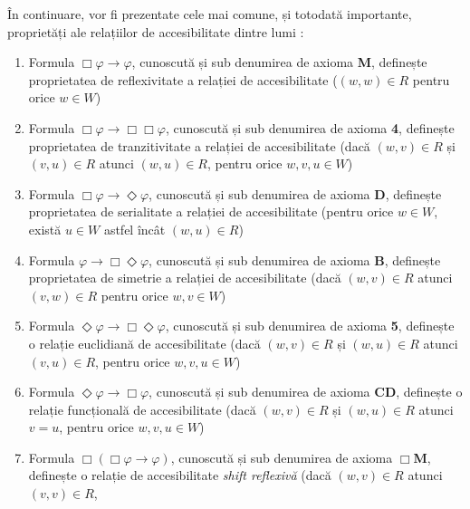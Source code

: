 \documentclass[12pt, openany]{book}
\begin{document}
            \par{}
                În continuare, vor fi prezentate cele mai comune, și totodată importante, proprietăți ale relațiilor de 
                accesibilitate dintre lumi \cite{stanford_modal_logic}:
                \begin{enumerate}
                    \item Formula $\Box \varphi \rightarrow \varphi$, cunoscută și sub denumirea de axioma \textbf{M}, definește 
                    proprietatea de reflexivitate a relației de accesibilitate ($(w,w) \in R$ pentru orice $w \in W$)
                    \item Formula $\Box \varphi \rightarrow \Box \Box \varphi$, cunoscută și sub denumirea de axioma \textbf{4},
                    definește proprietatea de tranzitivitate a relației de accesibilitate (dacă $(w,v) \in R$ și $(v,u) \in R$ 
                    atunci $(w,u) \in R$, pentru orice $w,v,u \in W$)
                    \item Formula $\Box \varphi \rightarrow \Diamond \varphi$, cunoscută și sub denumirea de axioma \textbf{D},
                    definește proprietatea de serialitate a relației de accesibilitate (pentru orice $w \in W$, există $u \in W$
                    astfel încât $(w,u) \in R$)
                    \item Formula $\varphi \rightarrow \Box \Diamond \varphi$, cunoscută și sub denumirea de axioma \textbf{B},
                    definește proprietatea de simetrie a relației de accesibilitate (dacă $(w,v) \in R$ atunci $(v,w) \in R$
                    pentru orice $w,v \in W$)
                    \item Formula $\Diamond \varphi \rightarrow \Box \Diamond \varphi$, cunoscută și sub denumirea de axioma
                    \textbf{5}, definește o relație euclidiană de accesibilitate (dacă $(w,v) \in R$ și $(w,u) \in R$ atunci
                    $(v,u) \in R$, pentru orice $w,v,u \in W$)
                    \item Formula $\Diamond \varphi \rightarrow \Box \varphi$, cunoscută și sub denumirea de axioma \textbf{CD},
                    definește o relație funcțională de accesibilitate (dacă $(w,v) \in R$ și $(w,u) \in R$ atunci $v=u$, pentru
                    orice $w,v,u \in W$)
                    \item Formula $\Box (\Box \varphi \rightarrow \varphi)$, cunoscută și sub denumirea de axioma $\Box$\textbf{M},
                    definește o relație de accesibilitate \textit{shift reflexivă} (dacă $(w,v) \in R$ atunci $(v,v) \in R$, 

\end{enumerate}
\end{document}
